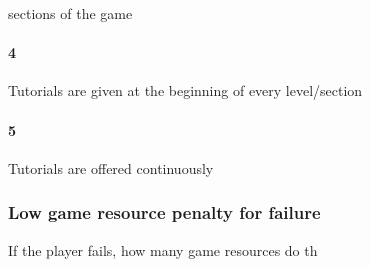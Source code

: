sections of the game\paragraph{4}Tutorials are given at the beginning of every level/section\paragraph{5}Tutorials are offered continuously\subsubsection{Low game resource penalty for failure}If the player fails, how many game resources do th
